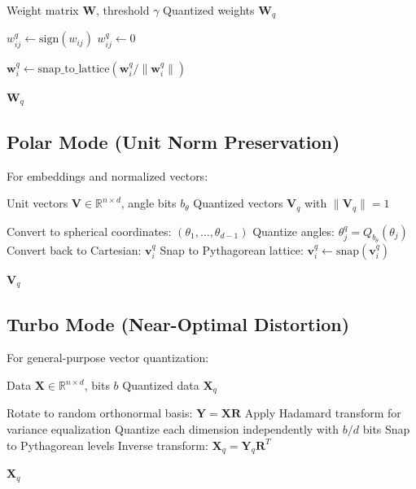\documentclass{article}
\begin{document}
\begin{algorithm}
\caption{Ternary Quantization with Pythagorean Snapping}
\begin{algorithmic}[1]
\REQUIRE Weight matrix $\mathbf{W}$, threshold $\gamma$
\ENSURE Quantized weights $\mathbf{W}_q$

        \STATE $w_{ij}^q \leftarrow \text{sign}(w_{ij})$
    \ELSE
        \STATE $w_{ij}^q \leftarrow 0$
    \ENDIF
\ENDFOR

    \STATE $\mathbf{w}_i^q \leftarrow \text{snap\_to\_lattice}(\mathbf{w}_i^q / \|\mathbf{w}_i^q\|)$
\ENDFOR

\RETURN $\mathbf{W}_q$
\end{algorithmic}
\end{algorithm}

\subsection{Polar Mode (Unit Norm Preservation)}

For embeddings and normalized vectors:

\begin{algorithm}
\caption{Polar Quantization with Exact Norm}
\begin{algorithmic}[1]
\REQUIRE Unit vectors $\mathbf{V} \in \mathbb{R}^{n \times d}$, angle bits $b_\theta$
\ENSURE Quantized vectors $\mathbf{V}_q$ with $\|\mathbf{V}_q\| = 1$

    \STATE Convert to spherical coordinates: $(\theta_1, \ldots, \theta_{d-1})$
    \STATE Quantize angles: $\theta_j^q = Q_{b_\theta}(\theta_j)$
    \STATE Convert back to Cartesian: $\mathbf{v}_i^q$
    \STATE Snap to Pythagorean lattice: $\mathbf{v}_i^q \leftarrow \text{snap}(\mathbf{v}_i^q)$
\ENDFOR

\RETURN $\mathbf{V}_q$
\end{algorithmic}
\end{algorithm}

\subsection{Turbo Mode (Near-Optimal Distortion)}

For general-purpose vector quantization:

\begin{algorithm}
\caption{TurboQuant with Pythagorean Enhancement}
\begin{algorithmic}[1]
\REQUIRE Data $\mathbf{X} \in \mathbb{R}^{n \times d}$, bits $b$
\ENSURE Quantized data $\mathbf{X}_q$

\STATE Rotate to random orthonormal basis: $\mathbf{Y} = \mathbf{X} \mathbf{R}$
\STATE Apply Hadamard transform for variance equalization
\STATE Quantize each dimension independently with $b/d$ bits
\STATE Snap to Pythagorean levels
\STATE Inverse transform: $\mathbf{X}_q = \mathbf{Y}_q \mathbf{R}^T$

\RETURN $\mathbf{X}_q$
\end{algorithmic}
\end{algorithm}
\end{document}
